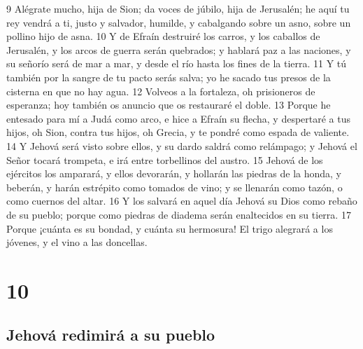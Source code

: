 9 Alégrate mucho, hija de Sion; da voces de júbilo, hija de Jerusalén; he aquí tu rey vendrá a ti, justo y salvador, humilde, y cabalgando sobre un asno, sobre un pollino hijo de asna. 
10 Y de Efraín destruiré los carros, y los caballos de Jerusalén, y los arcos de guerra serán quebrados; y hablará paz a las naciones, y su señorío será de mar a mar, y desde el río hasta los fines de la tierra. 
11 Y tú también por la sangre de tu pacto serás salva; yo he sacado tus presos de la cisterna en que no hay agua.
12 Volveos a la fortaleza, oh prisioneros de esperanza; hoy también os anuncio que os restauraré el doble.
13 Porque he entesado para mí a Judá como arco, e hice a Efraín su flecha, y despertaré a tus hijos, oh Sion, contra tus hijos, oh Grecia, y te pondré como espada de valiente.
14 Y Jehová será visto sobre ellos, y su dardo saldrá como relámpago; y Jehová el Señor tocará trompeta, e irá entre torbellinos del austro.
15 Jehová de los ejércitos los amparará, y ellos devorarán, y hollarán las piedras de la honda, y beberán, y harán estrépito como tomados de vino; y se llenarán como tazón, o como cuernos del altar.
16 Y los salvará en aquel día Jehová su Dios como rebaño de su pueblo; porque como piedras de diadema serán enaltecidos en su tierra.
17 Porque ¡cuánta es su bondad, y cuánta su hermosura! El trigo alegrará a los jóvenes, y el vino a las doncellas.

\chapter{10}

\section*{Jehová redimirá a su pueblo}

